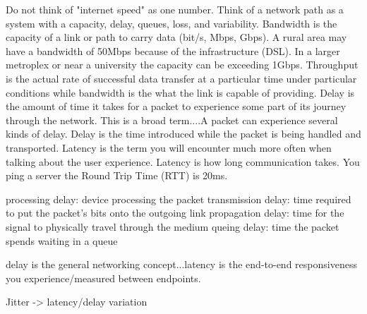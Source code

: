 \documentclass{article}
\begin{document}
Do not think of "internet speed" as one number. Think of a network path as a system with a capacity, delay, queues, loss, and variability. Bandwidth is the capacity of a link or path to carry data (bit/s, Mbps, Gbps). A rural area may have a bandwidth of 50Mbps because of the infrastructure (DSL). In a larger metroplex or near a university the capacity can be exceeding 1Gbps. Throughput is the actual rate of successful data transfer at a particular time under particular conditions while bandwidth is the what the link is capable of providing. Delay is the amount of time it takes for a packet to experience some part of its journey through the network. This is a broad term....A packet can experience several kinds of delay. Delay is the time introduced while the packet is being handled and transported. Latency is the term you will encounter much more often when talking about the user experience. Latency is how long communication takes. You ping a server the Round Trip Time (RTT) is 20ms.

processing delay: device processing the packet
transmission delay: time required to put the packet's bits onto the outgoing link
propagation delay: time for the signal to physically travel through the medium
queing delay: time the packet spends waiting in a queue

delay is the general networking concept...latency is the end-to-end responsiveness you experience/measured between endpoints.

Jitter -> latency/delay variation
\end{document}
